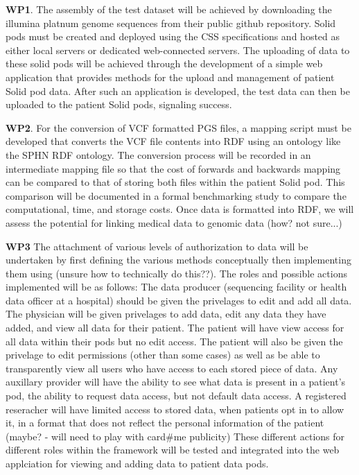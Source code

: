 \documentclass[runningheads]{llncs}
\begin{document}
\textbf{WP1}.
The assembly of the test dataset will be achieved by downloading the illumina platnum genome sequences from their public github repository.
Solid pods must be created and deployed using the CSS specifications and hosted as either local servers or dedicated web-connected servers.
The uploading of data to these solid pods will be achieved through the development of a simple web application that provides methods for the upload and management of patient Solid pod data. 
After such an application is developed, the test data can then be uploaded to the patient Solid pods, signaling success.

\textbf{WP2}.
For the conversion of VCF formatted PGS files, a mapping script must be developed that converts the VCF file contents into RDF using an ontology like the SPHN RDF ontology. 
The conversion process will be recorded in an intermediate mapping file so that the cost of forwards and backwards mapping can be compared to that of storing both files within the patient Solid pod. 
This comparison will be documented in a formal benchmarking study to compare the computational, time, and storage costs.
Once data is formatted into RDF, we will assess the potential for linking medical data to genomic data (how? not sure...)

\textbf{WP3}
The attachment of various levels of authorization to data will be undertaken by first defining the various methods conceptually then implementing them using (unsure how to technically do this??). 
The roles and possible actions implemented will be as follows:
The data producer (sequencing facility or health data officer at a hospital) should be given the privelages to edit and add all data. 
The physician will be given privelages to add data, edit any data they have added, and view all data for their patient.
The patient will have view access for all data within their pods but no edit access.
The patient will also be given the privelage to edit permissions (other than some cases) as well as be able to transparently view all users who have access to each stored piece of data.
Any auxillary provider will have the ability to see what data is present in a patient's pod, the ability to request data access, but not default data access.
A registered reseracher will have limited access to stored data, when patients opt in to allow it, in a format that does not reflect the personal information of the patient (maybe? - will need to play with card#me publicity)
These different actions for different roles within the framework will be tested and integrated into the web applciation for viewing and adding data to patient data pods. 
\end{document}
